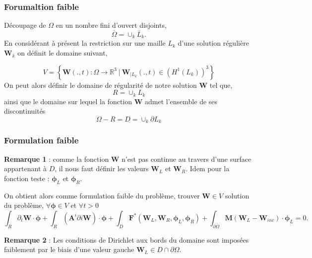\documentclass[9pt]{beamer}
\begin{document}
\begin{frame}
\frametitle{Forumaltion faible}
Découpage de $\Omega$ en un nombre fini d'ouvert disjoints,
\begin{equation}
\bar{\Omega} = \cup_k \bar{L}_k.
\end{equation}
En considérant à présent la restriction sur une maille $L_k$ d'une solution régulière $\mathbf{W}_k$ on définit le domaine suivant,

\begin{equation}
V = \left\{\mathbf{W}(.,t) : \Omega \rightarrow \mathbb{R}^3\ | \ \mathbf{W}_{|L_k}(.,t) \in  (H^1(L_k))^3 \right\}
\end{equation}
On peut alors définir le domaine de régularité de notre solution $\mathbf{W}$ tel que,
\begin{equation}
R = \cup_k L_k
\end{equation} 
ainsi que le domaine sur lequel la fonction $\mathbf{W}$ admet l'ensemble de ses discontinuités
\begin{equation}
\Omega - R = D = \cup_k \partial L_k
\end{equation}
\end{frame}



\begin{frame}
\frametitle{Formulation faible}
\textbf{Remarque 1} : comme la fonction $\mathbf{W}$ n'est pas continue au travers d'une surface appartenant à $D$, il nous faut définir les valeurs $\mathbf{W}_L$ et $\mathbf{W}_R$. Idem pour la fonction teste : $\mathbf{\phi}_L$ et $\mathbf{\phi}_R$.

On obtient alors comme formulation faible du problème, trouver $\mathbf{W} \in V$ solution du problème, $\forall \mathbf{\phi} \in V$ et $\forall t> 0$
\begin{equation}
\int_R \partial_t \mathbf{W} \cdot \mathbf{\phi}+
\int_R  (\mathbf{A}^i \partial i \mathbf{W}) \cdot \mathbf{\phi}+
\int_D \mathbf{F}^*(\mathbf{W}_L,\mathbf{W}_R,\mathbf{\phi}_L,\mathbf{\phi}_R)+
\int_{\partial \Omega} \mathbf{M}(\mathbf{W}_L - \mathbf{W}_{inc})\cdot \mathbf{\phi}_L=0.
\end{equation}

\textbf{Remarque 2} :  Les conditions de Dirichlet aux bords du domaine sont imposées faiblement par le biais d'une valeur gauche $\mathbf{W}_L \in D \cap \partial \Omega$.

\end{frame}
\end{document}

